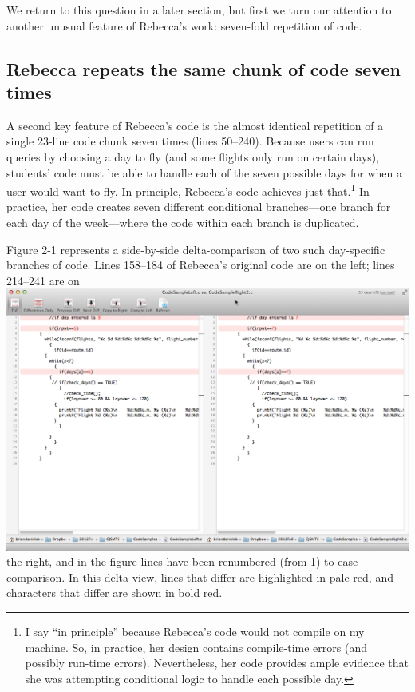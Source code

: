 We return to this question in a later section, but first we turn our attention to another unusual feature of Rebecca's work: seven-fold repetition of code.

\subsection{Rebecca repeats the same chunk of code seven times}\label{rebecca-repeats-the-same-chunk-of-code-seven-times}

A second key feature of Rebecca's code is the almost identical repetition of a single 23-line code chunk seven times (lines 50--240). Because users can run queries by choosing a day to fly (and some flights only run on certain days), students' code must be able to handle each of the seven possible days for when a user would want to fly. In principle, Rebecca's code achieves just that.\footnote{I say ``in principle'' because Rebecca's code would not compile on my machine. So, in practice, her design contains compile-time errors (and possibly run-time errors). Nevertheless, her code provides ample evidence that she was attempting conditional logic to handle each possible day.} In practice, her code creates seven different conditional branches---one branch for each day of the week---where the code within each branch is duplicated.

Figure 2-1 represents a side-by-side delta-comparison of two such day-specific branches of code. Lines 158--184 of Rebecca's original code are on the left; lines 214--241 are on \includegraphics{media/media/image3.png}the right, and in the figure lines have been renumbered (from 1) to ease comparison. In this delta view, lines that differ are highlighted in pale red, and characters that differ are shown in bold red.


